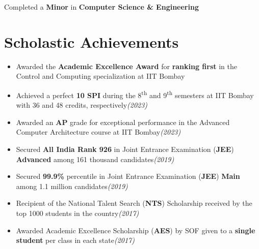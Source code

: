 \documentclass[10pt, a4paper]{article}
\newcommand{\rhsmall}[1]{\hfill{\footnotesize{\textsl{(#1)}}}}
\begin{document}
\thispagestyle{firstpage}
Completed a \textbf{Minor} in \textbf{Computer Science \& Engineering}
\section{Scholastic Achievements}
\begin{itemize}
	\item Awarded the \textbf{Academic Excellence Award} for \textbf{ranking first} in the Control and Computing specialization at IIT Bombay%
	\item Achieved a perfect \textbf{10 SPI} during the 8\textsuperscript{th} and 9\textsuperscript{th} semesters at IIT Bombay with 36 and 48 credits, respectively\rhsmall{2023}%
	\item Awarded an \textbf{AP} grade for exceptional performance in the Advanced Computer Architecture course at IIT Bombay\rhsmall{2023}
	\item Secured \textbf{All India Rank 926} in Joint Entrance Examination (\textbf{JEE}) \textbf{Advanced} among 161 thousand candidates\rhsmall{2019}
	\item Secured \textbf{99.9\%} percentile in Joint Entrance Examination (\textbf{JEE}) \textbf{Main} among 1.1 million candidates\rhsmall{2019}
	\item Recipient of the National Talent Search (\textbf{NTS}) Scholarship received by the top 1000 students in the country\rhsmall{2017}
	\item Awarded Academic Excellence Scholarship (\textbf{AES}) by SOF given to a \textbf{single  student} per class in each state\rhsmall{2017}%
\end{itemize}
\end{document}
